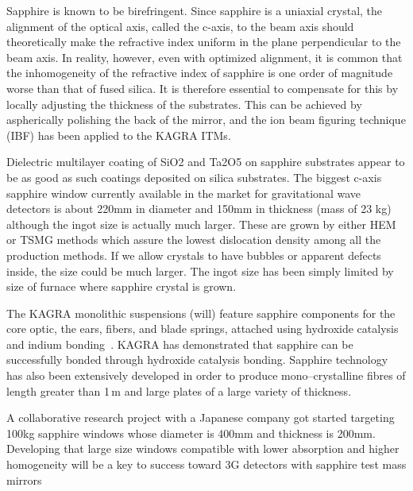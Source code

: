Sapphire is known to be birefringent. Since sapphire is a uniaxial crystal, the alignment of the optical axis, called the c-axis, to the beam axis should theoretically make the refractive index uniform in the plane perpendicular to the beam axis. In reality, however, even with optimized alignment, it is common that the inhomogeneity of the refractive index of sapphire is one order of magnitude worse than that of fused silica. It is therefore essential to compensate for this by locally adjusting the thickness of the substrates. This can be achieved by aspherically polishing the back of the mirror, and the ion beam figuring technique (IBF) has been applied to the KAGRA ITMs.

Dielectric multilayer coating of SiO2 and Ta2O5 on sapphire substrates appear to be as good as such coatings deposited on silica substrates\cite{Hirose_2014b}.
The biggest c-axis sapphire window currently available in the market for gravitational wave detectors is about 220mm in diameter and 150mm in thickness (mass of 23 kg) although the ingot size is actually much larger. These are grown by either HEM or TSMG methods which assure the lowest dislocation density among all the production methods. If we allow crystals to have bubbles or apparent defects inside, the size could be much larger. The ingot size has been simply limited by size of furnace where sapphire crystal is grown.

The KAGRA monolithic suspensions (will) feature sapphire components for the core optic, the ears, fibers, and blade springs, attached using hydroxide catalysis and indium bonding~\cite{Kumar:2016_KAGRA}. KAGRA has demonstrated that sapphire can be successfully bonded through hydroxide catalysis bonding. Sapphire technology has also been extensively developed in order to produce mono--crystalline fibres of length greater than 1\,m and large plates of a large variety of thickness. 

A collaborative research project with a Japanese company got started targeting 100kg sapphire windows whose diameter is 400mm and thickness is 200mm. Developing that large size windows compatible with lower absorption and higher homogeneity will be a key to success toward 3G detectors with sapphire test mass mirrors
